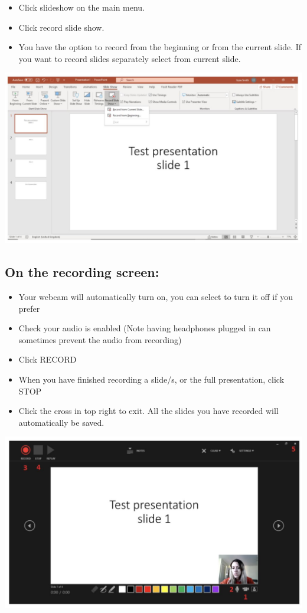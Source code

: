 \documentclass[
  12pt,
]{book}
\begin{document}
\begin{itemize}
\item
  Click slideshow on the main menu.
\item
  Click record slide show.
\item
  You have the option to record from the beginning or from the current slide. If you want to record slides separately select from current slide.
\end{itemize}

\includegraphics{powerpoint1.png}

\hypertarget{on-the-recording-screen}{%
\subsection{On the recording screen:}\label{on-the-recording-screen}}

\begin{itemize}
\item
  Your webcam will automatically turn on, you can select to turn it off if you prefer
\item
  Check your audio is enabled (Note having headphones plugged in can sometimes prevent the audio from recording)
\item
  Click RECORD
\item
  When you have finished recording a slide/s, or the full presentation, click STOP
\item
  Click the cross in top right to exit. All the slides you have recorded will automatically be saved.
\end{itemize}

\includegraphics{powerpoint2.png}
\end{document}
